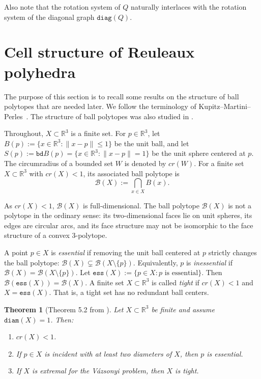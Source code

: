 \documentclass{article}
\newtheorem{theorem}{Theorem}[section]
\newcommand{\R}[0]{\mathbb{R}}
\newcommand{\Bc}[0]{\mathcal{B}}
\newcommand{\bd}[0]{\mathtt{bd}}
\newcommand{\diam}[0]{\mathtt{diam}}
\newcommand{\diag}[0]{\mathtt{diag}}
\newcommand{\ess}[0]{\mathtt{ess}}
\begin{document}
Also note that the rotation system of $Q$ naturally interlaces with the rotation system of the diagonal graph $\diag(Q)$. 









 
 

 
 





\section{Cell structure of Reuleaux polyhedra}\label{sec:cellstructure}
The purpose of this section is to recall some results on the structure of ball polytopes that are needed later. We follow the terminology of Kupitz--Martini--Perles~\cite{kupitz2010ball}. The structure of ball polytopes was also studied in \cite{bezdek2007ball,martini2019bodies,almohammad2022analogue,lopez2023borsuk}. 

Throughout, $X\subset \R^3$ is a finite set.  For $p\in\R^3$, let $B(p):=\{x\in \R^3:\|x-p\|\leq 1\}$ be the unit ball, and let $S(p):=\bd B(p)=\{x\in \R^3:\|x-p\|=1\}$ be the unit sphere centered at $p$. The circumradius of a bounded set \(W\) is denoted by \(cr(W)\). For a finite set \(X\subset \R^3\) with $cr(X)<1$, its associated ball polytope is
$$
        \Bc(X):=\bigcap_{x\in X} B(x).
$$


As $cr(X)<1$, $\Bc(X)$ is full-dimensional. The ball polytope $\Bc(X)$ is not a polytope in the ordinary sense: its two-dimensional faces lie on unit spheres, its edges are circular arcs, and its face structure may not be isomorphic to the face structure of a convex 3-polytope.


A point $p\in X$ is \emph{essential} if removing the unit ball centered at $p$ strictly changes the ball polytope: $        \Bc(X)\subsetneq \Bc(X\setminus\{p\})$. Equivalently, $p$ is \emph{inessential} if $\Bc(X)=\Bc(X\setminus\{p\})$. Let $\ess(X):=\{p\in X:p\text{ is essential}\}$. Then  $\Bc(\ess(X))=\Bc(X)$. A finite set $X\subset\R^3$ is called \emph{tight} if $cr(X)<1$ and $X=\ess(X)$. That is, a tight set has no redundant ball centers.


\begin{theorem}[Theorem 5.2 from \cite{kupitz2010ball}]
Let \(X\subset\R^3\) be finite and assume \(\diam(X)=1\).  Then:
\begin{enumerate}[label=\textup{(\roman*)}]
    \item \(cr(X)<1\).
    \item If \(p\in X\) is incident with at least two diameters of \(X\),
    then \(p\) is essential.
    \item If \(X\) is extremal for the Vázsonyi problem, then \(X\) is tight.
\end{enumerate}
\end{theorem}
\end{document}
